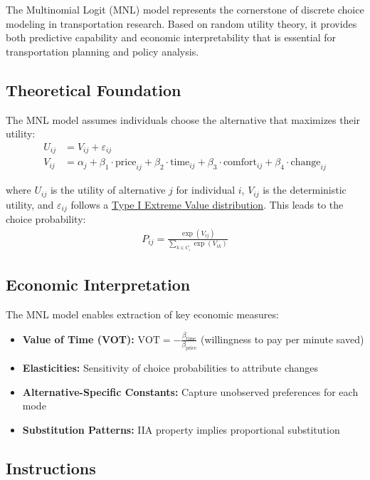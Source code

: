 \documentclass[11pt]{article}
\begin{document}
The Multinomial Logit (MNL) model represents the cornerstone of discrete choice modeling in transportation research. Based on random utility theory, it provides both predictive capability and economic interpretability that is essential for transportation planning and policy analysis.

\subsection*{Theoretical Foundation}

The MNL model assumes individuals choose the alternative that maximizes their utility:
\begin{align}
U_{ij} &= V_{ij} + \varepsilon_{ij} \\
V_{ij} &= \alpha_j + \beta_1 \cdot \text{price}_{ij} + \beta_2 \cdot \text{time}_{ij} + \beta_3 \cdot \text{comfort}_{ij} + \beta_4 \cdot \text{change}_{ij}
\end{align}

\noindent where $U_{ij}$ is the utility of alternative $j$ for individual $i$, $V_{ij}$ is the deterministic utility, and $\varepsilon_{ij}$ follows a \href{https://en.wikipedia.org/wiki/Gumbel_distribution}{Type I Extreme Value distribution}. This leads to the choice probability:
\begin{align}
P_{ij} = \frac{\exp(V_{ij})}{\sum_{k \in C_i} \exp(V_{ik})}
\end{align}

\subsection*{Economic Interpretation}

The MNL model enables extraction of key economic measures:
\begin{itemize}
\item \textbf{Value of Time (VOT):} $\text{VOT} = -\frac{\beta_{\text{time}}}{\beta_{\text{price}}}$ (willingness to pay per minute saved)
\item \textbf{Elasticities:} Sensitivity of choice probabilities to attribute changes
\item \textbf{Alternative-Specific Constants:} Capture unobserved preferences for each mode
\item \textbf{Substitution Patterns:} IIA property implies proportional substitution
\end{itemize}

\subsection*{Instructions}
\end{document}
